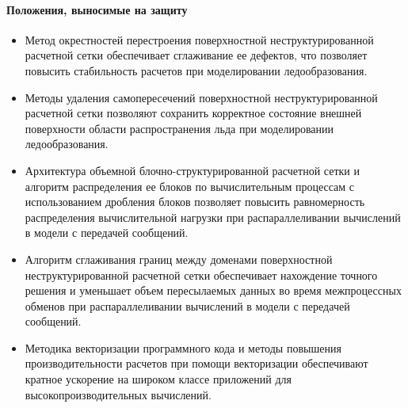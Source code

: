 \paragraph{Положения, выносимые на защиту}
\begin{itemize}[noitemsep,topsep=0pt,parsep=0pt,partopsep=0pt]
\item Метод окрестностей перестроения поверхностной неструктурированной расчетной сетки обеспечивает сглаживание ее дефектов, что позволяет повысить стабильность расчетов при моделировании ледообразования.
\item Методы удаления самопересечений поверхностной не\-структурированной расчетной сетки позволяют сохранить корректное состояние внешней поверхности области распространения льда при моделировании ледообразования.
\item Архитектура объемной блочно-структурированной расчетной сетки и алгоритм распределения ее блоков по вычислительным процессам с использованием дробления блоков позволяет повысить равномерность распределения вычислительной нагрузки при распараллеливании вычислений в модели с передачей сообщений.
\item Алгоритм сглаживания границ между доменами поверхностной неструктурированной расчетной сетки обеспечивает нахождение точного решения и уменьшает объем пересылаемых данных во время межпроцессных обменов при распараллеливании вычислений в модели с передачей сообщений.
\item Методика векторизации программного кода и методы повышения производительности расчетов при помощи векторизации обеспечивают кратное ускорение на широком классе приложений для высокопроизводительных вычислений.
\end{itemize}